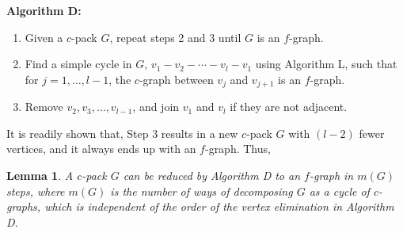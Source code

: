 \documentclass[notitlepage,preprint]{revtex4-1}
\newtheorem{lemm}[thrm]{Lemma}
\begin{document}
\textbf{Algorithm D:}
\begin{enumerate}
  \item
    Given a $c$-pack $G$,
      repeat steps 2 and 3 until $G$ is an $f$-graph.
  \item
    Find a simple cycle in $G$,
      $v_1 - v_2 - \cdots - v_l - v_1$
      using Algorithm L,
      such that
      for $j = 1, \dots, l-1$,
      the $c$-graph between $v_j$ and $v_{j+1}$
      is an $f$-graph.
  \item
    Remove $v_2, v_3, \dots, v_{l-1}$,
      and join $v_1$ and $v_l$ if they are not adjacent.
\end{enumerate}
%
It is readily shown that,
  Step 3 results in a new $c$-pack $G$
  with $(l - 2)$ fewer vertices,
  and it always ends up with an $f$-graph.
%
Thus,


\begin{lemm}
  A $c$-pack $G$ can be reduced
    by Algorithm D to an $f$-graph in $m(G)$ steps,
    where $m(G)$ is the number of ways of decomposing
    $G$ as a cycle of $c$-graphs,
    which is independent of the order of the vertex elimination
    in Algorithm D.
\label{thm:hncdecomp}
\end{lemm}
\end{document}
